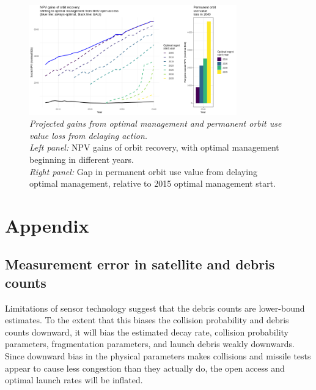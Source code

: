 \documentclass[12pt]{article}
\begin{document}
\begin{figure}[H]
	\centering
	\includegraphics[width=0.8\textwidth]{../../images/costs_of_inaction_2006_remfrac_0_remstart_2025.png}
	\captionsetup{format=hang}
	\caption[Permanent orbit use value loss from delaying action]{\textit{Projected gains from optimal management and permanent orbit use value loss from delaying action.} \\
		\textit{Left panel:} NPV gains of orbit recovery, with optimal management beginning in different years. \\
		\textit{Right panel:} Gap in permanent orbit use value from delaying optimal management, relative to 2015 optimal management start. \\
	}
	\label{costs_of_inaction}
\end{figure}

\newpage

{
	\setlength{\bibsep}{3pt}
	
	
}

\newpage

\section{Appendix}

\subsection{Measurement error in satellite and debris counts}
\label{physicsMeasurementError}

Limitations of sensor technology suggest that the debris counts are lower-bound estimates. To the extent that this biases the collision probability and debris counts downward, it will bias the estimated decay rate, collision probability parameters, fragmentation parameters, and launch debris weakly downwards. Since downward bias in the physical parameters makes collisions and missile tests appear to cause less congestion than they actually do, the open access and optimal launch rates will be inflated.\\
\end{document}
